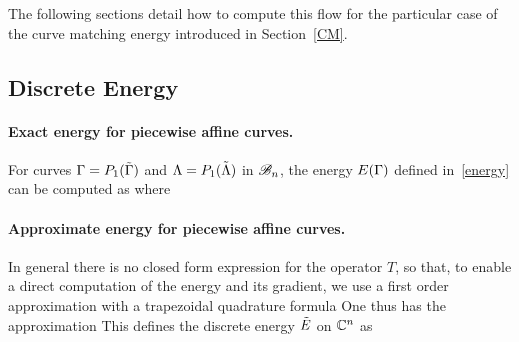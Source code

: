 The following sections detail how to compute this flow for the particular case of the curve matching energy introduced in Section~\ref{CM}. 

\subsection{Discrete Energy} 

\paragraph{Exact energy for piecewise affine curves. }

For curves $\Gamma=P_1(\tilde{\Gamma})$ and $\Lambda=P_1(\tilde{\Lambda})$ in $\mathcal{B}_n$, the energy $E(\Gamma)$ defined in~\eqref{energy} can be computed as
where

\paragraph{Approximate energy for piecewise affine curves. }

In general there is no closed form expression for the operator $T$, so that, to enable a direct computation of the energy and its gradient, we use a first order approximation with a trapezoidal quadrature formula
One thus has the approximation
This defines the discrete energy $\tilde{E}$ on $\mathbb{C}^n$ as 


